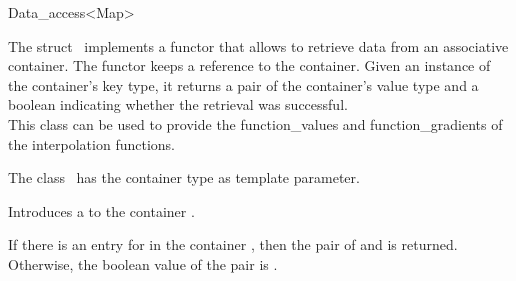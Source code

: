 \begin{ccRefClass}{Data_access<Map>}  %

\ccDefinition
  
The struct \ccRefName\ implements a functor that allows to retrieve
data from an associative container. The functor keeps a reference to
the container. Given an instance of the container's key type, it
returns a pair of the container's value type and a boolean indicating
whether the retrieval was successful.\\

This class can be used to provide the function\_values and
function\_gradients of the interpolation functions.


\ccParameters The class
\ccRefName\ has the container type  as template parameter.

\ccTypes 
{}
\ccGlue
{}
\ccCreation
{}  %
{Introduces a  to the container .}


 {If
  there is an entry for  in the container , then the
  pair of  and  is returned. Otherwise, the
  boolean value of the pair is .}

\ccSeeAlso
{}\\
 \\
 \\
 \\
 \\

\end{ccRefClass}


